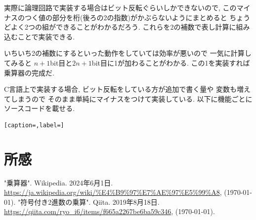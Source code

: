\documentclass[a4paper, xelatex, ja=standard]{bxjsarticle}
\begin{document}
実際に論理回路で実装する場合はビット反転ぐらいしかできないので,
このマイナスのつく値の部分を桁(後ろの2の指数)がかぶらないようにまとめると
ちょうどよく2つの組ができることがわかるだろう.
これらを2の補数で表し計算に組み込むことで実装できる.

いちいち2の補数にするといった動作をしていては効率が悪いので
一気に計算してみると
$n+1$bit目と$2n+1$bit目に1が加わることがわかる.
この1を実装すれば乗算器の完成だ.

C言語上で実装する場合,
ビット反転をしている方が追加で書く量や
変数も増えてしまうので
そのまま単純にマイナスをつけて実装している.
以下に機能ごとにソースコードを載せる.

\begin{lstlisting}[caption=,label=]
\end{lstlisting}

\section{所感}

\begin{thebibliography}{9}
 "乗算器". Wikipedia. 2024年6月1日. \url{https://ja.wikipedia.org/wiki/%E4%B9%97%E7%AE%97%E5%99%A8}, (\today).
 "符号付き2進数の乗算". Qiita. 2019年8月18日. \url{https://qiita.com/ryo_i6/items/f665a2267be6ba59c346}, (\today).
\end{thebibliography}
\end{document}
